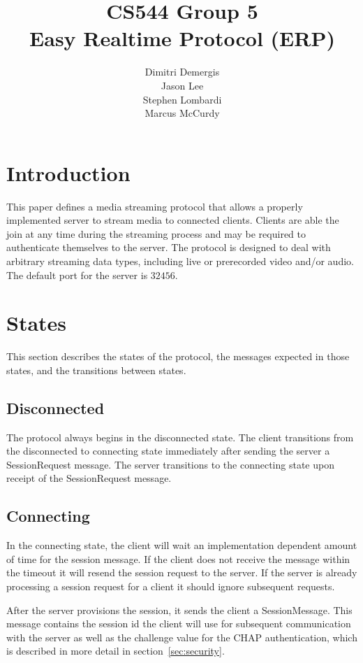 \documentclass[12pt,letterpaper,titlepage]{article}
\author{Dimitri Demergis \\ Jason Lee \\ Stephen Lombardi \\ Marcus McCurdy}
\title{CS544 Group 5 \\ Easy Realtime Protocol (ERP)}
\begin{document}
\maketitle

\tableofcontents

\pagebreak

\section{Introduction}
This paper defines a media streaming protocol that allows a properly implemented server to stream media to connected clients. Clients are able the join at any time during the streaming process and may be required to authenticate themselves to the server. The protocol is designed to deal with arbitrary streaming data types, including live or prerecorded video and/or audio. The default port for the server is $32456$.


\section{States}
This section describes the states of the protocol, the messages expected in those states, and the
transitions between states.

\subsection{Disconnected}
The protocol always begins in the disconnected state. The client transitions from the disconnected
to connecting state immediately after  sending the server a SessionRequest message. 
The server transitions to the connecting state upon receipt of the SessionRequest message.

\subsection{Connecting}
In the connecting state, the client will wait an implementation dependent amount of time for the 
session message. If the client does not receive the message within the timeout it will resend
the session request to the server. If the server is already processing a session request for a client
it should ignore subsequent requests.

After the server provisions the session, it sends the client a SessionMessage. This message 
contains the session id the client will use for subsequent communication with the server as
well as the challenge value for the CHAP authentication, which is described in more detail
in section~\ref{sec:security}.
\end{document}

